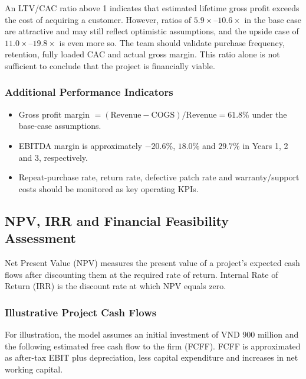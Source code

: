 An LTV/CAC ratio above 1 indicates that estimated lifetime gross profit exceeds
the cost of acquiring a customer. However, ratios of $5.9\times$--$10.6\times$ in the base
case are attractive and may still reflect optimistic assumptions, and the upside case of
$11.0\times$--$19.8\times$ is even more so. The team should validate
purchase frequency, retention, fully loaded CAC and actual gross margin. This
ratio alone is not sufficient to conclude that the project is financially viable.

\subsubsection{Additional Performance Indicators}
\begin{itemize}[itemsep=0pt]
  \item Gross profit margin $= (\text{Revenue} - \text{COGS}) / \text{Revenue}
    = 61.8\%$ under the base-case assumptions.
  \item EBITDA margin is approximately $-20.6\%$, $18.0\%$ and $29.7\%$ in
    Years 1, 2 and 3, respectively.
  \item Repeat-purchase rate, return rate, defective patch rate and
    warranty/support costs should be monitored as key operating KPIs.
\end{itemize}

\subsection{NPV, IRR and Financial Feasibility Assessment}
Net Present Value (NPV) measures the present value of a project's expected cash
flows after discounting them at the required rate of return. Internal Rate of
Return (IRR) is the discount rate at which NPV equals zero.

\subsubsection{Illustrative Project Cash Flows}
For illustration, the model assumes an initial investment of VND 900 million and
the following estimated free cash flow to the firm (FCFF). FCFF is approximated as
after-tax EBIT plus depreciation, less capital expenditure and increases in net
working capital.

